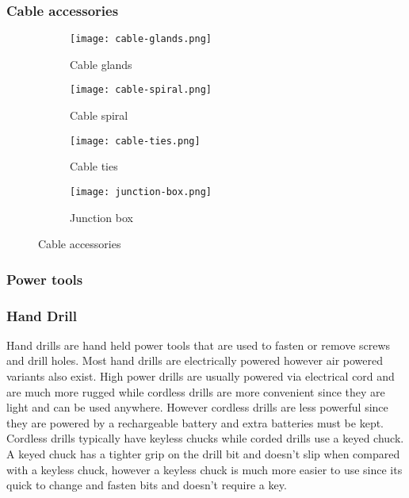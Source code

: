 \documentclass[a4paper,12pt]{article}
\begin{document}
				\subsubsection*{Cable accessories}
					\begin{figure}[H]
						\begin{subfigure}{0.4\textwidth}
							\centering				
							\texttt{[image: cable-glands.png]}
							\caption{Cable glands}
							\label{subfig:cable-glands}
						\end{subfigure}
						\hfill						
						\begin{subfigure}{0.4\textwidth}
							\centering				
							\texttt{[image: cable-spiral.png]}
							\caption{Cable spiral}
							\label{subfig:cable-spiral}
						\end{subfigure}
						\hfill
						\begin{subfigure}{0.4\textwidth}
							\centering				
							\texttt{[image: cable-ties.png]}
							\caption{Cable ties}
							\label{subfig:cable-ties}
						\end{subfigure}
						\hfill
						\begin{subfigure}{0.4\textwidth}
							\centering				
							\texttt{[image: junction-box.png]}
							\caption{Junction box}
							\label{subfig:junction-box}
						\end{subfigure}
					
						\label{cable-accessories}
						\caption{Cable accessories}
					\end{figure}
			\newpage
			\subsubsection{Power tools}
				\subsubsection*{Hand Drill}
				
				Hand drills are hand held power tools that are used to fasten or remove screws and drill holes.
				Most hand drills are electrically powered however air powered variants also exist.
				High power drills are usually powered via electrical cord and are much more rugged while cordless drills are more convenient since they are light and can be used anywhere.
				However cordless drills are less powerful since they are powered by a rechargeable battery and extra batteries must be kept.
				Cordless drills typically have keyless chucks while corded drills use a keyed chuck.
				A keyed chuck has a tighter grip on the drill bit and doesn't slip when compared with a keyless chuck, however a keyless chuck is much more easier to use since its quick to change and fasten bits and doesn't require a key. 
				
\end{document}
